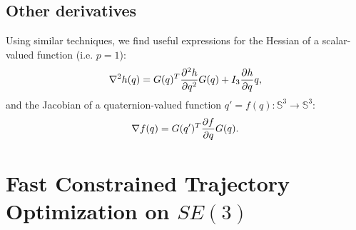 \documentclass[letterpaper, 10 pt, conference]{ieeeconf}  %
\newcommand{\Q}{\mathbb{S}^3}
\begin{document}
    \subsection{Other derivatives}
        Using similar techniques, we find useful expressions for the Hessian of a
        scalar-valued function (i.e. $p = 1$):
	    \begin{equation} \label{eq:quat_hessian}
            \nabla^2 h(q) = G(q)^T \pdv[2]{h}{q} G(q) + I_3 \pdv{h}{q}q,
        \end{equation}
        and the Jacobian of a quaternion-valued function $q' = f(q) : \Q \to \Q$:
        \begin{equation} \label{eq:quat_jacobian}
            \nabla f(q) = G(q')^T \pdv{f}{q} G(q).
        \end{equation}


\section{Fast Constrained Trajectory Optimization on $SE(3)$}
\end{document}
